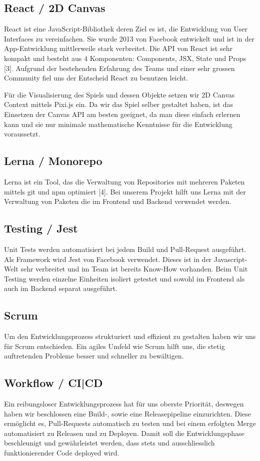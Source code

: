 \documentclass[11pt,a4paper,titlepage]{article}
\begin{document}
\subsection{React / 2D Canvas}
React ist eine JavaScript-Bibliothek deren Ziel es ist, die Entwicklung von User Interfaces zu vereinfachen. Sie wurde 2013 von Facebook entwickelt und ist in der App-Entwicklung mittlerweile stark verbreitet.
Die API von React ist sehr kompakt und besteht aus 4 Komponenten: Components, JSX, State und Props [3].
Aufgrund der bestehenden Erfahrung des Teams und einer sehr grossen Community fiel uns der Entscheid React zu benutzen leicht.

Für die Visualisierung des Spiels und dessen Objekte setzen wir 2D Canvas Context mittels Pixi.js ein. Da wir das Spiel selber gestaltet haben, ist das Einsetzen der Canvas API am besten geeignet, da man diese einfach erlernen kann und sie nur minimale mathematische Kenntnisse für die Entwicklung voraussetzt.

\subsection{Lerna / Monorepo}
Lerna ist ein Tool, das die Verwaltung von Repositories mit mehreren Paketen mittels git und npm optimiert [4]. Bei unserem Projekt hilft uns Lerna mit der Verwaltung von Paketen die im Frontend und Backend verwendet werden.

\subsection{Testing / Jest}
Unit Tests werden automatisiert bei jedem Build und Pull-Request ausgeführt.
Als Framework wird Jest von Facebook verwendet. Dieses ist in der Javascript-Welt sehr verbreitet und im Team ist bereits Know-How vorhanden.
Beim Unit Testing werden einzelne Einheiten isoliert getestet und sowohl im Frontend als auch im Backend separat ausgeführt.

\subsection{Scrum}
Um den Entwicklungsprozess strukturiert und effizient zu gestalten haben wir uns für Scrum entschieden. Ein agiles Umfeld wie Scrum hilft uns, die stetig auftretenden Probleme besser und schneller zu bewältigen.


\subsection{Workflow / CI|CD}
Ein reibungsloser Entwicklungsprozess hat für uns oberste Priorität, deswegen haben wir beschlossen eine Build-, sowie eine Releasepipeline einzurichten. Diese ermöglicht es, Pull-Requests automatisch zu testen und bei einem erfolgten Merge automatisiert zu Releasen und zu Deployen.
Damit soll die Entwicklungsphase beschleunigt und gewährleistet werden, dass stets und ausschliesslich funktionierender Code deployed wird.
\end{document}
